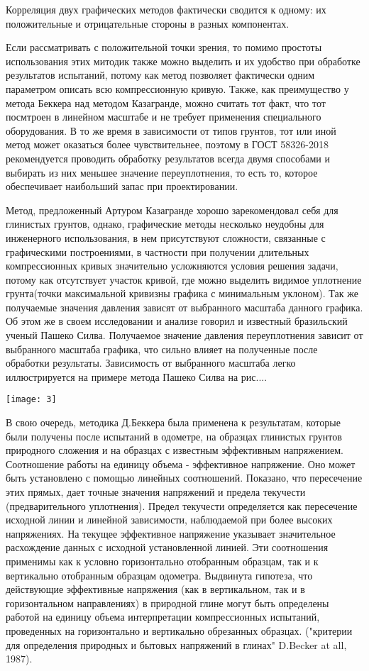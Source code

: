 Корреляция двух графических методов фактически сводится к одному: их положительные и отрицательные стороны в разных компонентах. 

Если рассматривать с положительной точки зрения, то помимо простоты использования этих митодик также можно выделить и их удобство при обработке результатов испытаний, потому как метод позволяет фактически одним параметром  описать всю компрессионную кривую. Также, как преимущество у метода Беккера над методом Казагранде, можно считать тот факт, что тот посмтроен в линейном масштабе и не требует применения специального оборудования. В то же время в зависимости от типов грунтов, тот или иной метод может оказаться более чувствительнее, поэтому в ГОСТ 58326-2018 рекомендуется проводить обработку результатов всегда двумя способами и выбирать из них меньшее значение переуплотнения, то есть то, которое обеспечивает наибольший запас при проектировании.

 Метод, предложенный Артуром Казагранде хорошо зарекомендовал себя для глинистых грунтов, однако, графические методы несколько неудобны для инженерного использования, в нем присутствуют сложности, связанные с графическими построениями, в частности при получении длительных компрессионных кривых значительно усложняются условия решения задачи, потому как отсутствует участок кривой, где можно выделить видимое уплотнение грунта(точки максимальной кривизны графика с минимальным уклоном). Так же получаемые значения давления зависят от выбранного масштаба данного графика. Об этом же в своем исследовании и анализе говорил и известный бразильский ученый Пашеко Силва. Получаемое значение давления переуплотнения зависит от выбранного масштаба графика, что сильно влияет на полученные после обработки результаты.
 Зависимость от выбранного масштаба легко иллюстрируется на примере метода Пашеко Силва на рис....

\texttt{[image: 3]}

В свою очередь, методика Д.Беккера была применена к результатам, которые были получены после испытаний в одометре, на образцах глинистых грунтов природного сложения и на образцах с известным эффективным напряжением. Соотношение работы на единицу объема - эффективное напряжение. Оно может быть установлено с помощью линейных соотношений. Показано, что пересечение этих прямых, дает точные значения напряжений и предела текучести (предварительного уплотнения). Предел текучести определяется как пересечение исходной линии и линейной зависимости, наблюдаемой при более высоких напряжениях. На текущее эффективное напряжение указывает значительное расхождение данных с исходной установленной линией. Эти соотношения применимы как к условно горизонтально отобранным образцам, так и к вертикально отобранным образцам одометра. Выдвинута гипотеза, что действующие эффективные напряжения (как в вертикальном, так и в горизонтальном направлениях) в природной глине могут быть определены работой на единицу объема интерпретации компрессионных испытаний, проведенных на горизонтально и вертикально обрезанных образцах. ("критерии для определения природных и бытовых напряжений в глинах" D.Becker at all, 1987).

